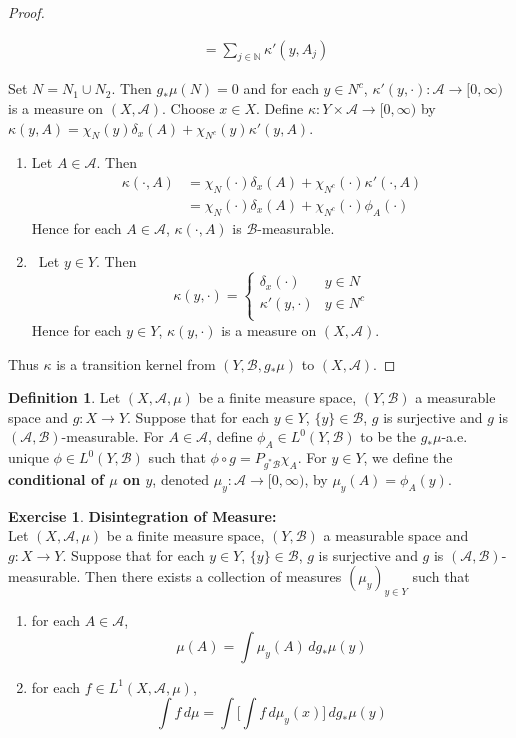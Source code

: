\documentclass{book}
\theoremstyle{definition}
\newtheorem{defn}[definition]{Definition}
\newtheorem{ex}[definition]{Exercise}
\newcommand{\del}{\delta}
\newcommand{\kap}{\kappa}
\newcommand{\N}{\mathbb{N}}
\newcommand{\MA}{\mathcal{A}}
\newcommand{\MB}{\mathcal{B}}
\DeclareMathOperator*{\0}{\mbf{0}}
\DeclareMathOperator*{\1}{\mbf{1}}
\newcommand{\Rg}{[0,\infty)}
\newcommand{\dmu}{\, d \mu}
\begin{document}
\begin{proof}
\begin{itemize}
\begin{align*}
				& =  \sum\limits_{j \in \N} \kap'(y, A_j)
			\end{align*}
		\end{itemize}
		Set $N = N_1 \cup N_2$. Then $g_*\mu(N) = 0$ and for each $y \in N^c$, $\kap'(y, \cdot): \MA \rightarrow \Rg$ is a measure on $(X, \MA)$. Choose $x \in X$. Define $\kap: Y \times \MA \rightarrow \Rg$ by $\kap (y, A) = \chi_{N}(y)\del_{x}(A) + \chi_{N^c}(y)\kap'(y, A)$. 
		\begin{enumerate}
			\item Let $A \in \MA$. Then 
			\begin{align*}
				\kap(\cdot, A) 
				& = \chi_N(\cdot) \del_x(A) + \chi_{N^c}(\cdot) \kap'(\cdot, A) \\ 
				& = \chi_N(\cdot) \del_x(A) + \chi_{N^c}(\cdot) \phi_A(\cdot) 
			\end{align*}
			Hence for each $A \in \MA$, $\kap(\cdot, A)$ is $\MB$-measurable.
			\item \
			Let $y \in Y$. Then 
			\[
			\kap(y, \cdot) = 
			\begin{cases}
				\del_x(\cdot) & y \in N \\
				\kap'(y, \cdot) & y \in N^c \\
			\end{cases}
			\]
			Hence for each $y \in Y$, $\kap(y, \cdot)$ is a measure on $(X, \MA)$. 
		\end{enumerate}
		Thus $\kap$ is a transition kernel from $(Y, \MB, g_*\mu)$ to $(X, \MA)$.
	\end{proof}
	
	\begin{defn}
		Let $(X, \MA, \mu)$ be a finite measure space, $(Y, \MB)$ a measurable space and $g: X \rightarrow Y$. Suppose that for each $y \in Y$, $\{y\} \in \MB$, $g$ is surjective and $g$ is $(\MA, \MB)$-measurable. For $A \in \MA$, define $\phi_A \in L^0(Y, \MB )$ to be the $g_*\mu$-a.e. unique $\phi \in L^0(Y, \MB)$ such that $\phi \circ g = P_{g^*\MB} \chi_A$. For $y \in Y$, we define the \textbf{conditional of $\mu$ on $y$}, denoted $\mu_y : \MA \rightarrow \Rg$, by $\mu_y(A) = \phi_A(y)$. 
	\end{defn}
	
	\begin{ex} \textbf{Disintegration of Measure:} \\
		Let $(X, \MA, \mu)$ be a finite measure space, $(Y, \MB)$ a measurable space and $g: X \rightarrow Y$. Suppose that for each $y \in Y$, $\{y\} \in \MB$, $g$ is surjective and $g$ is $(\MA, \MB)$-measurable. Then there exists a collection of measures $(\mu_y)_{y \in Y}$ such that  
		\begin{enumerate}
			\item for each $A \in \MA$, 
			$$\mu(A) = \int \mu_y(A) \, d g_*\mu(y) $$
			\item for each $f \in L^1(X, \MA, \mu)$, 
			$$\int f \dmu = \int \bigg[ \int f \, d\mu_y(x) \bigg] \, d g_*\mu(y)$$ 
		\end{enumerate}
	\end{ex}
	
\end{document}

